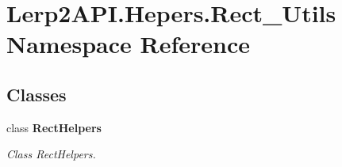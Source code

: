 \hypertarget{namespace_lerp2_a_p_i_1_1_hepers_1_1_rect___utils}{}\section{Lerp2\+A\+P\+I.\+Hepers.\+Rect\+\_\+\+Utils Namespace Reference}
\label{namespace_lerp2_a_p_i_1_1_hepers_1_1_rect___utils}
\subsection*{Classes}
\begin{DoxyCompactItemize}
\item 
class {\bfseries Rect\+Helpers}
\begin{DoxyCompactList}\small\item\em Class Rect\+Helpers. \end{DoxyCompactList}\end{DoxyCompactItemize}
